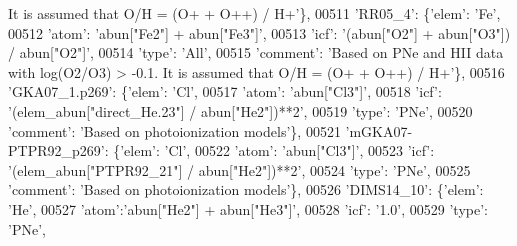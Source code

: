 \begin{DoxyCode}
{       It is assumed that O/H = (O+ + O++) / H+'}\},
00511                          \textcolor{stringliteral}{'RR05\_4'}: \{\textcolor{stringliteral}{'elem'}: \textcolor{stringliteral}{'Fe'},
00512                                       \textcolor{stringliteral}{'atom'}: \textcolor{stringliteral}{'abun["Fe2"] + abun["Fe3"]'},
00513                                       \textcolor{stringliteral}{'icf'}: \textcolor{stringliteral}{'(abun["O2"] + abun["O3"]) / abun["O2"]'},
00514                                       \textcolor{stringliteral}{'type'}: \textcolor{stringliteral}{'All'},
00515                                       \textcolor{stringliteral}{'comment'}: \textcolor{stringliteral}{'Based on PNe and HII data with log(O2/O3) > -0.1. It is
       assumed that O/H = (O+ + O++) / H+'}\},
00516                          \textcolor{stringliteral}{'GKA07\_1.p269'}: \{\textcolor{stringliteral}{'elem'}: \textcolor{stringliteral}{'Cl'},
00517                                       \textcolor{stringliteral}{'atom'}: \textcolor{stringliteral}{'abun["Cl3"]'},
00518                                       \textcolor{stringliteral}{'icf'}: \textcolor{stringliteral}{'(elem\_abun["direct\_He.23"] / abun["He2"])**2'},
00519                                       \textcolor{stringliteral}{'type'}: \textcolor{stringliteral}{'PNe'},
00520                                       \textcolor{stringliteral}{'comment'}: \textcolor{stringliteral}{'Based on photoionization models'}\},
00521                          \textcolor{stringliteral}{'mGKA07-PTPR92\_p269'}: \{\textcolor{stringliteral}{'elem'}: \textcolor{stringliteral}{'Cl'},
00522                                       \textcolor{stringliteral}{'atom'}: \textcolor{stringliteral}{'abun["Cl3"]'},
00523                                       \textcolor{stringliteral}{'icf'}: \textcolor{stringliteral}{'(elem\_abun["PTPR92\_21"] / abun["He2"])**2'},
00524                                       \textcolor{stringliteral}{'type'}: \textcolor{stringliteral}{'PNe'},
00525                                       \textcolor{stringliteral}{'comment'}: \textcolor{stringliteral}{'Based on photoionization models'}\},
00526                          \textcolor{stringliteral}{'DIMS14\_10'}: \{\textcolor{stringliteral}{'elem'}: \textcolor{stringliteral}{'He'},
00527                                        \textcolor{stringliteral}{'atom'}:\textcolor{stringliteral}{'abun["He2"] + abun["He3"]'}, 
00528                                        \textcolor{stringliteral}{'icf'}: \textcolor{stringliteral}{'1.0'},
00529                                        \textcolor{stringliteral}{'type'}: \textcolor{stringliteral}{'PNe'},

\end{DoxyCode}

